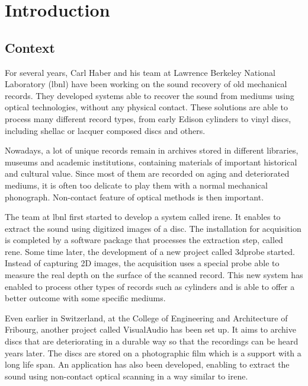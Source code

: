 %

\newcommand{\Csh}{C$^\sharp$}


\chapter{Introduction}

\section{Context}

For several years, Carl Haber and his team at Lawrence Berkeley National Laboratory (\gls{lbnl}) have been working on the sound recovery of old mechanical records. They developed systems able to recover the sound from mediums using optical technologies, without any physical contact. These solutions are able to process many different record types, from early Edison cylinders to vinyl discs, including shellac or lacquer composed discs and others.

Nowadays, a lot of unique records remain in archives stored in different libraries, museums and academic institutions, containing materials of important historical and cultural value. Since most of them are recorded on aging and deteriorated mediums, it is often too delicate to play them with a normal mechanical phonograph. Non-contact feature of optical methods is then important.

The team at \gls{lbnl} first started to develop a system called \gls{irene}. It enables to extract the sound using digitized images of a disc. The installation for acquisition is completed by a software package that processes the extraction step, called \gls{rene}. Some time later, the development of a new project called \gls{3dprobe} started. Instead of capturing 2D images, the acquisition uses a special probe able to measure the real depth on the surface of the scanned record. This new system has enabled to process other types of records such as cylinders and is able to offer a better outcome with some specific mediums.

Even earlier in Switzerland, at the College of Engineering and Architecture of Fribourg, another project called VisualAudio has been set up. It aims to archive discs that are deteriorating in a durable way so that the recordings can be heard years later. The discs are stored on a photographic film which is a support with a long life span. An application has also been developed, enabling to extract the sound using non-contact optical scanning in a way similar to \gls{irene}.

